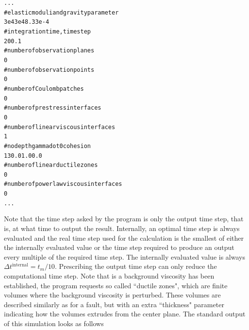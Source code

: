 \documentclass[10pt]{article}
\begin{document}
\begin{alltt}
...
# elastic moduli and gravity parameter
3e4 3e4 8.33e-4
# integration time, time step
{\color{orange}20 0.1}
# number of observation planes
0
# number of observation points
0
# number of Coulomb patches
0
# number of prestress interfaces
0
# number of linear viscous interfaces
{\color{orange}1}
# no depth gammadot0 cohesion
{\color{orange}   1  30.0       1.0      0.0}
# number of linear ductile zones
{\color{orange}0}
# number of powerlaw viscous interfaces
0
...
\end{alltt}
Note that the time step asked by the program is only the output time step, that is, at what time to output the result. Internally, an optimal time step is always evaluated and the real time step used for the calculation is the smallest of either the internally evaluated value or the time step required to produce an output every multiple of the required time step. The internally evaluated value is always $\Delta t^{\text{internal}}=t_m/10$. Prescribing the output time step can only reduce the computational time step. Note that is a background viscosity has been established, the program requests so called ``ductile zones", which are finite volumes where the background viscosity is perturbed. These volumes are described similarly as for a fault, but with an extra ``thickness" parameter indicating how the volumes extrudes from the center plane. The standard output of this simulation looks as follows
\end{document}
